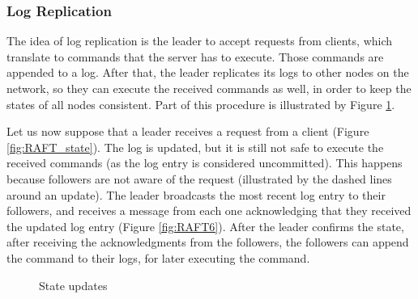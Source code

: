 \documentclass[12pt,a4paper]{article}
\begin{document}
\subsubsection{Log Replication}
The idea of log replication is the leader to accept requests from clients, which translate to commands that the server has to execute. Those commands are appended to a log. After that, the leader replicates its logs to other nodes on the network, so they can execute the received commands as well, in order to keep the states of all nodes consistent. Part of this procedure is illustrated by Figure \ref{fig:su_2}. 

Let us now suppose that a leader receives a request from a client (Figure \ref{fig:RAFT_state}). The log is updated, but it is still not safe to execute the received commands (as the log entry is considered uncommitted). This happens because followers are not aware of the request (illustrated by the dashed lines around an update). The leader broadcasts the most recent log entry to their followers, and receives a message from each one acknowledging that they received the updated log entry (Figure \ref{fig:RAFT6}). After the leader confirms the state, after receiving the acknowledgments from the followers, the followers can append the command to their logs, for later executing the command. 


\begin{figure}[h!]
    \centering
    \qquad
    \caption{State updates}%
    \label{fig:su_2}%
\end{figure}
\end{document}
